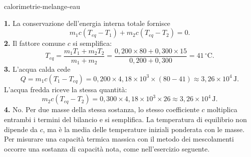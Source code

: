 \begin{exo}{calorimetrie-melange-eau}
\begin{solution}
\textbf{1.} La conservazione dell'energia interna totale fornisce
\[
m_1c(T_{eq}-T_1)+m_2c(T_{eq}-T_2)=0.
\]
\textbf{2.} Il fattore comune $c$ si semplifica:
\[
T_{eq}=\frac{m_1T_1+m_2T_2}{m_1+m_2}
=\frac{0{,}200\times80+0{,}300\times15}{0{,}200+0{,}300}=41\,^\circ\text{C}.
\]
\textbf{3.} L'acqua calda cede
\[
Q=m_1c(T_1-T_{eq})=0{,}200\times4{,}18\times10^3\times(80-41)
\approx3{,}26\times10^4\,\text{J}.
\]
L'acqua fredda riceve la stessa quantità:
\[
m_2c(T_{eq}-T_2)=0{,}300\times4{,}18\times10^3\times26
\approx3{,}26\times10^4\,\text{J}.
\]
\textbf{4.} No. Per due masse della stessa sostanza, lo stesso coefficiente $c$ moltiplica entrambi i termini del bilancio e si semplifica. La temperatura di equilibrio non dipende da $c$, ma è la media delle temperature iniziali ponderata con le masse. Per misurare una capacità termica massica con il metodo dei mescolamenti occorre una sostanza di capacità nota, come nell'esercizio seguente.
\end{solution}
\end{exo}

